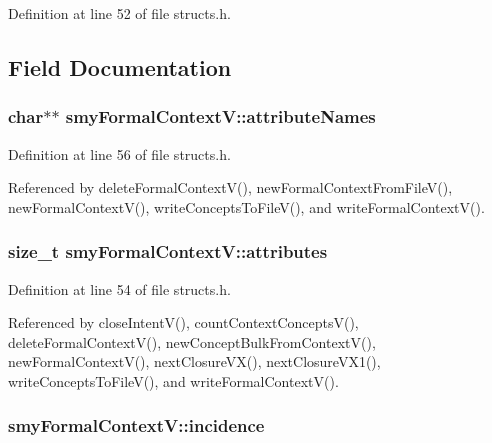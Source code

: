 \-Definition at line 52 of file structs.\-h.



\subsection{\-Field \-Documentation}
\hypertarget{structsmyFormalContextV_a10705bdd28894f84042e9c1be7f697c6}{
\subsubsection[{attribute\-Names}]{\setlength{\rightskip}{0pt plus 5cm}char$\ast$$\ast$ {\bf smy\-Formal\-Context\-V\-::attribute\-Names}}}\label{structsmyFormalContextV_a10705bdd28894f84042e9c1be7f697c6}


\-Definition at line 56 of file structs.\-h.



\-Referenced by delete\-Formal\-Context\-V(), new\-Formal\-Context\-From\-File\-V(), new\-Formal\-Context\-V(), write\-Concepts\-To\-File\-V(), and write\-Formal\-Context\-V().

\hypertarget{structsmyFormalContextV_a94d6bf1233ed7e796e71595d53e85265}{
\subsubsection[{attributes}]{\setlength{\rightskip}{0pt plus 5cm}size\-\_\-t {\bf smy\-Formal\-Context\-V\-::attributes}}}\label{structsmyFormalContextV_a94d6bf1233ed7e796e71595d53e85265}


\-Definition at line 54 of file structs.\-h.



\-Referenced by close\-Intent\-V(), count\-Context\-Concepts\-V(), delete\-Formal\-Context\-V(), new\-Concept\-Bulk\-From\-Context\-V(), new\-Formal\-Context\-V(), next\-Closure\-V\-X(), next\-Closure\-V\-X1(), write\-Concepts\-To\-File\-V(), and write\-Formal\-Context\-V().

\hypertarget{structsmyFormalContextV_a1cc9b0c27ade0450dfe33b04c1f767b8}{
\subsubsection[{incidence}]{ {\bf smy\-Formal\-Context\-V\-::incidence}}}\label{structsmyFormalContextV_a1cc9b0c27ade0450dfe33b04c1f767b8}


